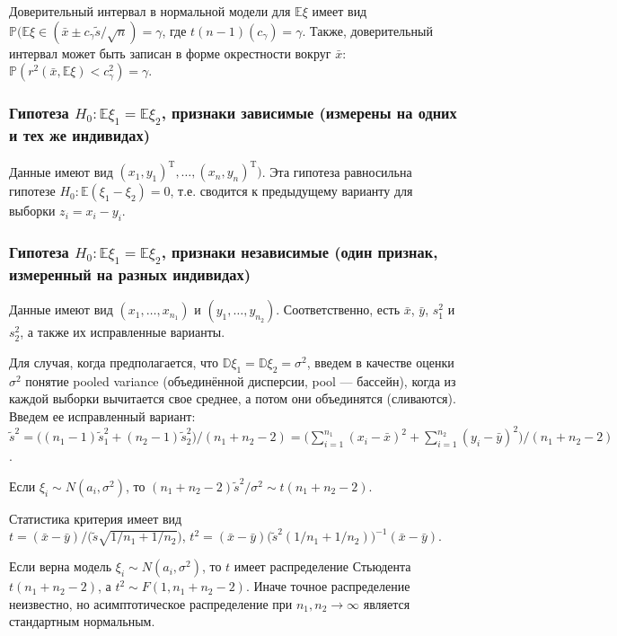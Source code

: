 \documentclass[12 pt]{article}
\def\E{\mathbb{E}}
\def\P{\mathbb{P}}
\def\D{\mathbb{D}}
\begin{document}
Доверительный интервал в нормальной модели для $\E\xi$ имеет вид $\P(\E\xi \in (\bar{x}\pm c_\gamma \widetilde{s}/\sqrt{n}) = \gamma$,
где $t(n-1)(c_\gamma)=\gamma$. Также, доверительный интервал может быть записан в форме окрестности вокруг $\bar{x}$:
$\P(r^2(\bar{x},\E\xi) < c_\gamma^2)=\gamma$.

\subsubsection*{Гипотеза $H_0: \E\xi_1 = \E\xi_2$, признаки зависимые (измерены на одних и тех же индивидах)}
Данные имеют вид $(x_1,y_1)^\textrm{T}, \ldots, (x_n,y_n)^\textrm{T})$.
Эта гипотеза равносильна гипотезе $H_0:\E(\xi_1 -\xi_2) = 0$, т.е. сводится к предыдущему варианту для выборки
$z_i = x_i - y_i$.

\subsubsection*{Гипотеза $H_0: \E\xi_1 = \E\xi_2$, признаки независимые (один признак, измеренный на разных индивидах)}

Данные имеют вид $(x_1, \ldots, x_{n_1})$ и $(y_1, \ldots, y_{n_2})$.
Соответственно, есть $\bar{x}$, $\bar{y}$, $s_1^2$ и $s_2^2$, а также их исправленные варианты.

Для случая, когда предполагается, что $\D\xi_1 = \D\xi_2 = \sigma^2$,
введем в качестве оценки $\sigma^2$ понятие pooled variance (объединённой дисперсии, pool --- бассейн),
когда из каждой выборки вычитается свое среднее, а потом они объединятся (сливаются).
Введем ее исправленный вариант:\\
$\widetilde{s}^2 = \big((n_1-1) \widetilde{s}_1^2 + (n_2-1) \widetilde{s}_2^2\big)/ (n_1+n_2-2)
= \big(\sum_{i=1}^{n_1} (x_i-\bar{x})^2 + \sum_{i=1}^{n_2} (y_i-\bar{y})^2\big)/(n_1+n_2-2)$.

Если $\xi_i \sim N(a_i,\sigma^2)$, то $(n_1+n_2-2)\widetilde{s}^2/\sigma^2 \sim t(n_1+n_2-2)$.

Статистика критерия имеет вид\\
$ t = (\bar{x} - \bar{y})/\big(\widetilde{s}\sqrt{1/n_1 + 1/n_2}\big)$,
$ t^2 = (\bar{x} - \bar{y})\big(\widetilde{s}^2(1/n_1 + 1/n_2)\big)^{-1} (\bar{x} - \bar{y})$.

Если верна модель $\xi_i \sim N(a_i,\sigma^2)$, то $t$ имеет распределение Стьюдента $t(n_1+n_2 - 2)$,
а $t^2\sim F(1,n_1+n_2-2)$.
Иначе точное распределение неизвестно, но асимптотическое распределение при $n_1,n_2 \rightarrow \infty$
является стандартным нормальным.
\end{document}
